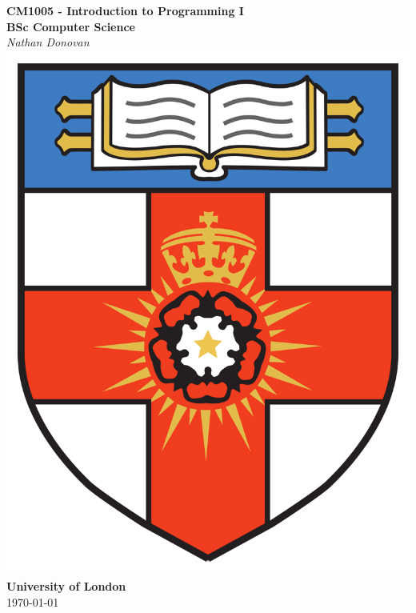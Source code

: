\documentclass{article}
\begin{document}
\begin{titlepage}
    \centering
    \vspace*{2cm} %
    
    {\LARGE\bfseries CM1005 - Introduction to Programming I}\\[0.8cm]
    {\large\bfseries BSc Computer Science}\\[0.5cm] %
    
    {\large\textit{Nathan Donovan}}\\[1.5cm] %

    \includegraphics[scale=0.1]{../images/university-of-london-logo.png}\\[1.5cm] %
    {\Large\bfseries University of London}\\[1cm] %
    {\large \today}

    \vfill %
    
    
\end{titlepage}
\end{document}
